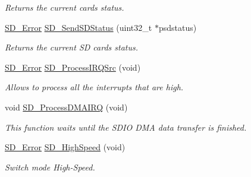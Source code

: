 \begin{DoxyCompactItemize}
\begin{DoxyCompactList}\small\item\em Returns the current card\textquotesingle{}s status. \end{DoxyCompactList}\item 
\hyperlink{group__sd__card_gacff91fa68daa1d1ee967b5b3fb3dbd8c}{S\+D\+\_\+\+Error} \hyperlink{group__sd__card__private_gab573516bdaa3054877172415e66d0e57}{S\+D\+\_\+\+Send\+S\+D\+Status} (uint32\+\_\+t $\ast$psdstatus)
\begin{DoxyCompactList}\small\item\em Returns the current SD card\textquotesingle{}s status. \end{DoxyCompactList}\item 
\hyperlink{group__sd__card_gacff91fa68daa1d1ee967b5b3fb3dbd8c}{S\+D\+\_\+\+Error} \hyperlink{group__sd__card__private_gab21b0412e865d8cabc915dc840fa1ccc}{S\+D\+\_\+\+Process\+I\+R\+Q\+Src} (void)
\begin{DoxyCompactList}\small\item\em Allows to process all the interrupts that are high. \end{DoxyCompactList}\item 
void \hyperlink{group__sd__card__private_ga52ec18498c19918549142f6680a7b21e}{S\+D\+\_\+\+Process\+D\+M\+A\+I\+RQ} (void)
\begin{DoxyCompactList}\small\item\em This function waits until the S\+D\+IO D\+MA data transfer is finished. \end{DoxyCompactList}\item 
\hyperlink{group__sd__card_gacff91fa68daa1d1ee967b5b3fb3dbd8c}{S\+D\+\_\+\+Error} \hyperlink{group__sd__card__private_ga2457c748cf09c7ad5d3c9211d11e3fab}{S\+D\+\_\+\+High\+Speed} (void)
\begin{DoxyCompactList}\small\item\em Switch mode High-\/\+Speed. \end{DoxyCompactList}\end{DoxyCompactItemize}
